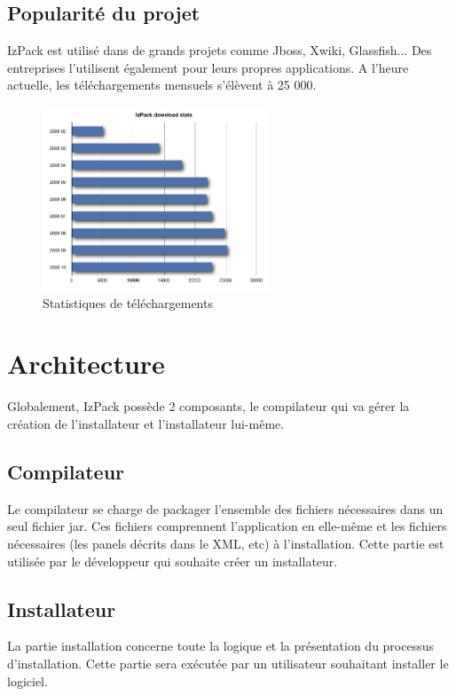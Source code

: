 \subsection{Popularité du projet}
IzPack est utilisé dans de grands projets comme Jboss, Xwiki, Glassfish... Des entreprises l'utilisent également pour leurs propres applications. A l'heure actuelle, les téléchargements mensuels s'élèvent à 25 000.
\begin{figure}[H]
	\centering
	\includegraphics[width=0.6\textwidth]{../image/telechargements.png}
	\caption{Statistiques de téléchargements}
\end{figure}
\section{Architecture}
Globalement, IzPack possède 2 composants, le compilateur qui va gérer la création de l'installateur et l'installateur lui-même.

\subsection{Compilateur}
Le compilateur se charge de packager l'ensemble des fichiers nécessaires dans un seul fichier jar.
Ces fichiers comprennent l'application en elle-même et les fichiers nécessaires (les panels décrits dans le XML, etc) à l'installation.
Cette partie est utilisée par le développeur qui souhaite créer un installateur.

\subsection{Installateur}
La partie installation concerne toute la logique et la présentation du processus d'installation. Cette partie sera exécutée par un utilisateur souhaitant installer le logiciel.

